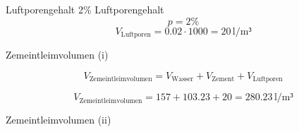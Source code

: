 \begin{frame}{Luftporengehalt}
    2\% Luftporengehalt
    \vspace{1cm}
    \pause
    \begin{equation*}
        p = 2\%
    \end{equation*}
    \pause
    \begin{equation*}
        V_{\text{Luftporen}} = 0.02 \cdot 1000 = 20 \, \text{l/m³}
    \end{equation*}
    
\end{frame}

\begin{frame}{Zemeintleimvolumen (i)}

    \begin{equation*}
        V_{\text{Zemeintleimvolumen}} = V_{\text{Wasser}} + V_{\text{Zement}} + V_{\text{Luftporen}}
    \end{equation*}
    \pause
    
    \begin{equation*}
        V_{\text{Zemeintleimvolumen}} = 157 + 103.23 + 20 = 280.23 \, \text{l/m³}
    \end{equation*}

\end{frame}

\begin{frame}{Zemeintleimvolumen (ii)}
    \begin{table}[h]
        \centering
        \caption{Aufgabe zur Stoffraumberechnung}
        \small
    \label{tab:Stoffraumberechnung}
        \end{table}

\end{frame}

